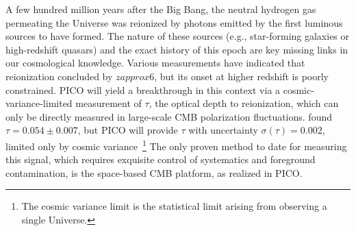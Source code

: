\documentclass[PICOReport.tex]{subfiles}
\begin{document}
A few hundred million years after the Big Bang, the neutral hydrogen gas permeating the Universe was reionized by photons emitted by the first luminous sources to have formed.  The nature of these sources (e.g., star-forming galaxies or high-redshift quasars) and the exact history of this epoch are key missing links in our cosmological knowledge.  Various measurements have indicated that reionization concluded by $z approx 6$, but its onset at higher redshift is poorly constrained.  PICO will yield a breakthrough in this context via a cosmic-variance-limited measurement of $\tau$, the optical depth to reionization, which can only be directly measured in large-scale CMB polarization fluctuations.  \planck found $\tau = 0.054 \pm 0.007$, but PICO will provide $\tau$ with uncertainty $\sigma (\tau) = 0.002$, limited only by cosmic variance~\footnote{The cosmic variance limit is the statistical limit arising from observing a single Universe.}  The only proven method to date for measuring this signal, which requires exquisite control of systematics and foreground contamination, is the space-based CMB platform, as realized in PICO.

\end{document}
